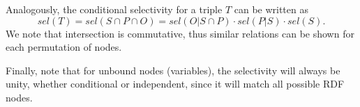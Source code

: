 \documentclass[12pt]{article}
\begin{document}
Analogously, the conditional selectivity for a triple $T$ can be written as 
\begin{equation}
sel(T) = sel(S \cap P \cap O) = sel(O | S \cap P) \cdot sel(P | S)
\cdot sel(S) . 
\end{equation}
We note that intersection is commutative, thus similar
relations can be shown for each permutation of nodes.

Finally, note that for unbound nodes (variables), the selectivity will
always be unity, whether conditional or independent, since it will
match all possible RDF nodes. 




\end{document}
